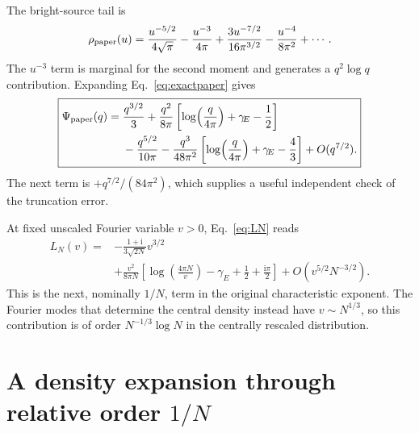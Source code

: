 \documentclass[11pt]{article}
\newcommand{\ii}{\mathrm i}
\newcommand{\gE}{\gamma_{\!E}}
\begin{document}
The bright-source tail is
\begin{equation}
 \rho_{\rm paper}(u)=\frac{u^{-5/2}}{4\sqrt\pi}
 -\frac{u^{-3}}{4\pi}
 +\frac{3u^{-7/2}}{16\pi^{3/2}}
 -\frac{u^{-4}}{8\pi^2}+\cdots.
 \label{eq:papertail}
\end{equation}
The $u^{-3}$ term is marginal for the second moment and generates a
$q^2\log q$ contribution. Expanding Eq.~\eqref{eq:exactpaper} gives
\begin{equation}
\boxed{\begin{aligned}
 \Psi_{\rm paper}(q)={}&\frac{q^{3/2}}3
 +\frac{q^2}{8\pi}
  \left[\log\!\left(\frac{q}{4\pi}\right)+\gE-\frac12\right]\\
 &-\frac{q^{5/2}}{10\pi}
 -\frac{q^3}{48\pi^2}
  \left[\log\!\left(\frac{q}{4\pi}\right)+\gE-\frac43\right]
 +O(q^{7/2}).
\end{aligned}}
\label{eq:paperexpansion}
\end{equation}
The next term is $+q^{7/2}/(84\pi^2)$, which supplies a useful independent
check of the truncation error.

At fixed unscaled Fourier variable $v>0$, Eq.~\eqref{eq:LN} reads
\begin{align}
 L_N(v)={}&-\frac{1+\ii}{3\sqrt{2N}}v^{3/2}\nonumber\\
 &+\frac{v^2}{8\pi N}
 \left[\log\!\left(\frac{4\pi N}{v}\right)
       -\gE+\frac12+\frac{\ii\pi}{2}\right]
 +O(v^{5/2}N^{-3/2}).
 \label{eq:fixedv}
\end{align}
This is the next, nominally $1/N$, term in the original characteristic
exponent. The Fourier modes that determine the central density instead have
$v\sim N^{1/3}$, so this contribution is of order
$N^{-1/3}\log N$ in the centrally rescaled distribution.

\section{A density expansion through relative order \texorpdfstring{$1/N$}{1/N}}
\label{sec:density}
\end{document}
